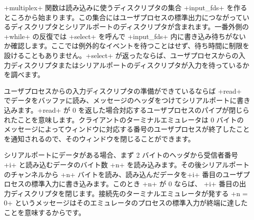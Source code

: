 \begin{example}
\ml+multiplex+ 関数は読み込みに使うディスクリプタの集合 \ml+input_fds+ を作るところから始まります。この集合にはユーザプロセスの標準出力につながっているディスクリプタとシリアルポートのディスクリプタが含まれます。一番外側の \ml+while+ の反復では \ml+select+ を呼んで \ml+input_fds+ 内に書き込み待ちがないか確認します。ここでは例外的なイベントを待つことはせず、待ち時間に制限を設けることもありません。\ml+select+ が返ったならば、ユーザプロセスからの入力ディスクリプタまたはシリアルポートのディスクリプタが入力を待っているかを調べます。

ユーザプロセスからの入力ディスクリプタの準備ができているならば \ml+read+ でデータをバッファに読み、メッセージのヘッダをつけてシリアルポートに書き込みます。\ml+read+ が 0 を返した場合対応するユーザプロセスのパイプが閉じられたことを意味します。クライアントのターミナルエミュレータは 0 バイトのメッセージによってウィンドウに対応する番号のユーザプロセスが終了したことを通知されるので、そのウィンドウを閉じることができます。

シリアルポートにデータがある場合、まず 2 バイトのヘッダから受信者番号 \ml+i+ と読み込むデータのバイト数 \ml+n+ を読み込みます。その後シリアルポートのチャンネルから \ml+n+ バイトを読み、読み込んだデータを\ml+i+ 番目のユーザプロセスの標準入力に書き込みます。このとき \ml+n+ が 0 ならば、 \ml+i+ 番目の出力ディスクリプタを閉じます。接続先のターミナルエミュレータが発する \ml+n = 0+ というメッセージはそのエミュレータのプロセスの標準入力が終端に達したことを意味するからです。


\end{example}
